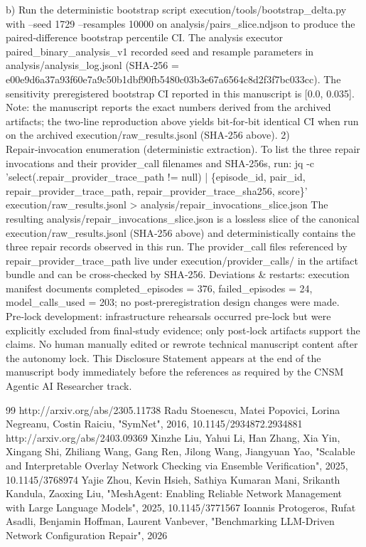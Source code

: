 \documentclass[conference]{IEEEtran}
\begin{document}
   b) Run the deterministic bootstrap script execution/tools/bootstrap\_delta.py with --seed 1729 --resamples 10000 on analysis/pairs\_slice.ndjson to produce the paired‑difference bootstrap percentile CI. The analysis executor paired\_binary\_analysis\_v1 recorded seed and resample parameters in analysis/analysis\_log.jsonl (SHA‑256 = e00e9d6a37a93f60e7a9c50b1dbf90fb5480c03b3e67a6564c8d2f3f7bc033cc). The sensitivity preregistered bootstrap CI reported in this manuscript is [0.0, 0.035].
   Note: the manuscript reports the exact numbers derived from the archived artifacts; the two‑line reproduction above yields bit‑for‑bit identical CI when run on the archived execution/raw\_results.jsonl (SHA‑256 above).
2) Repair‑invocation enumeration (deterministic extraction). To list the three repair invocations and their provider\_call filenames and SHA‑256s, run:
      jq -c 'select(.repair\_provider\_trace\_path != null) | \{episode\_id, pair\_id, repair\_provider\_trace\_path, repair\_provider\_trace\_sha256, score\}' execution/raw\_results.jsonl > analysis/repair\_invocations\_slice.json
   The resulting analysis/repair\_invocations\_slice.json is a lossless slice of the canonical execution/raw\_results.jsonl (SHA‑256 above) and deterministically contains the three repair records observed in this run. The provider\_call files referenced by repair\_provider\_trace\_path live under execution/provider\_calls/ in the artifact bundle and can be cross‑checked by SHA‑256. Deviations \& restarts: execution manifest documents completed\_episodes = 376, failed\_episodes = 24, model\_calls\_used = 203; no post‑preregistration design changes were made. Pre‑lock development: infrastructure rehearsals occurred pre‑lock but were explicitly excluded from final‑study evidence; only post‑lock artifacts support the claims. No human manually edited or rewrote technical manuscript content after the autonomy lock. This Disclosure Statement appears at the end of the manuscript body immediately before the references as required by the CNSM Agentic AI Researcher track.

\begin{thebibliography}{99}
 http://arxiv.org/abs/2305.11738
 Radu Stoenescu, Matei Popovici, Lorina Negreanu, Costin Raiciu, "SymNet", 2016, 10.1145/2934872.2934881
 http://arxiv.org/abs/2403.09369
 Xinzhe Liu, Yahui Li, Han Zhang, Xia Yin, Xingang Shi, Zhiliang Wang, Gang Ren, Jilong Wang, Jiangyuan Yao, "Scalable and Interpretable Overlay Network Checking via Ensemble Verification", 2025, 10.1145/3768974
 Yajie Zhou, Kevin Hsieh, Sathiya Kumaran Mani, Srikanth Kandula, Zaoxing Liu, "MeshAgent: Enabling Reliable Network Management with Large Language Models", 2025, 10.1145/3771567
 Ioannis Protogeros, Rufat Asadli, Benjamin Hoffman, Laurent Vanbever, "Benchmarking LLM-Driven Network Configuration Repair", 2026
\end{thebibliography}
\end{document}
